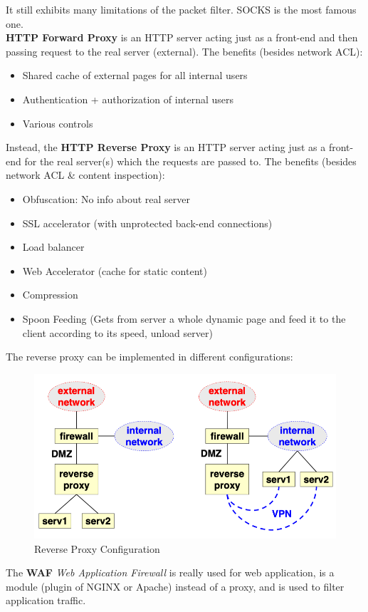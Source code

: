 \documentclass[12pt]{article}
\begin{document}
It still exhibits many limitations of the packet filter. SOCKS is the most famous one.\\
\textbf{HTTP Forward Proxy} is an HTTP server acting just as a front-end and then passing request to the real server (external). The benefits (besides network ACL):
\begin{itemize}
  \item Shared cache of external pages for all internal users
  \item Authentication + authorization of internal users
  \item Various controls
\end{itemize}
Instead, the \textbf{HTTP Reverse Proxy} is an HTTP server acting just as a front-end for the real server(s) which the requests are passed to. The benefits (besides network ACL \& content inspection):
\begin{itemize}
  \item Obfuscation: No info about real server
  \item SSL accelerator (with unprotected back-end connections)
  \item Load balancer
  \item Web Accelerator (cache for static content)
  \item Compression
  \item Spoon Feeding (Gets from server a whole dynamic page and feed it to the client according to its speed, unload server)
\end{itemize}
The reverse proxy can be implemented in different configurations:
\begin{figure}[H]
   \centering
   \includegraphics[width=\linewidth]{images/reverse_config.png}
   \caption{Reverse Proxy Configuration}
   \label{fig:reverse_config}
\end{figure}
The \textbf{WAF} \textit{Web Application Firewall} is really used for web application, is a module (plugin of NGINX or Apache) instead of a proxy, and is used to filter application traffic.\\
\end{document}
